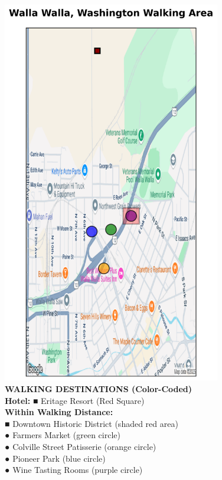 \documentclass[
  10pt,
]{article}
\begin{document}
\begin{figure}[h]
\centering
\includegraphics[width=0.85\textwidth]{images/walla_walla_wa_walking_map.png}
\caption{\textbf{\textcolor{primary}{WALKING DESTINATIONS (Color-Coded)}} \\ 
\textbf{\textcolor{secondary}{Hotel:}} \textcolor{mapred}{■} Eritage Resort (Red Square) \\
\textbf{\textcolor{secondary}{Within Walking Distance:}} \\
\textcolor{mapred}{■} \textcolor{mapred}{Downtown Historic District} (shaded red area) \\
\textcolor{mapgreen}{●} \textcolor{mapgreen}{Farmers Market} (green circle) \\
\textcolor{maporange}{●} \textcolor{maporange}{Colville Street Patisserie} (orange circle) \\
\textcolor{mapblue}{●} \textcolor{mapblue}{Pioneer Park} (blue circle) \\
\textcolor{mappurple}{●} \textcolor{mappurple}{Wine Tasting Rooms} (purple circle)}
\end{figure}
\end{document}
